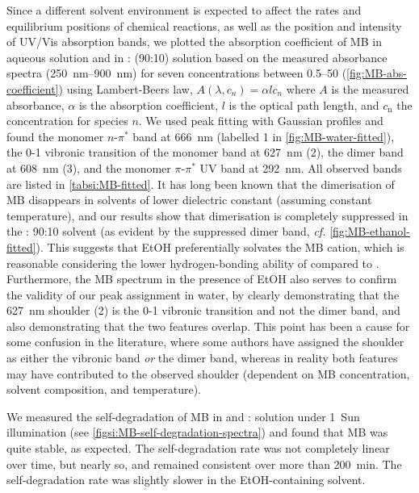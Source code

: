 \documentclass[9pt,twoside,twocolumn]{article}\usepackage{knitr}
\begin{document}
\begin{refsection}
Since a different solvent environment is expected to affect the rates and equilibrium positions of chemical reactions, as well as the position and intensity of UV/Vis absorption bands, \cite{Reichardt1994} we plotted the absorption coefficient of MB in aqueous solution and in : (90:10) solution based on the measured absorbance spectra (\qtyrange{250}{900}{\nm}) for seven concentrations between \qtyrange[range-phrase=\ensuremath{\text{ and }}]{0.5}{50}{\micromolar} (\cref{fig:MB-abs-coefficient}) using Lambert-Beers law, $A(\lambda,c_n) = \alpha lc_n$
where $A$ is the measured absorbance, $\alpha$ is the absorption coefficient, $l$ is the optical path length, and $c_\text{n}$ the concentration for species $n$.
We used peak fitting with Gaussian profiles and found the monomer $n$-$\pi^\ast$ band at \qty{666}{\nm} (labelled \textsf{1} in \cref{fig:MB-water-fitted}), the \num{0}-\num{1} vibronic transition of the monomer band at \qty{627}{\nm} (\textsf{2}), the dimer band at \qty{608}{\nm} (\textsf{3}), and the monomer $\pi$-$\pi^\ast$ UV band at \qty{292}{\nm}. 
All observed bands are listed in \cref{tabsi:MB-fitted}. 
It has long been known that the dimerisation of MB disappears in solvents of lower dielectric constant (assuming constant temperature), \cite{Lewis1943} and our results show that dimerisation is completely suppressed in the : 90:10 solvent (as evident by the suppressed dimer band, \textit{cf.} \cref{fig:MB-ethanol-fitted}).
This suggests that EtOH preferentially solvates the MB cation, which is reasonable considering the lower hydrogen-bonding ability of  compared to .
Furthermore, the MB spectrum in the presence of EtOH also serves to confirm the validity of our peak assignment in water, by clearly demonstrating that the \qty{627}{\nm} shoulder (\textsf{2}) is the \num{0}-\num{1} vibronic transition and not the dimer band, and also demonstrating that the two features overlap. 
This point has been a cause for some confusion in the literature, where some authors have assigned the shoulder as either the vibronic band \emph{or} the dimer band, \cite{Heger2005,Parkanyi1993,Cenens1988,Bergmann1963} whereas in reality both features may have contributed to the observed shoulder (dependent on MB concentration, solvent composition, and temperature). 

We measured the self-degradation of MB in  and : solution under 1~Sun illumination (see \cref{figsi:MB-self-degradation-spectra}) and found that MB was quite stable, as expected.
The self-degradation rate was not completely linear over time, but nearly so, and remained consistent over more than \qty{200}{\minute}. The self-degradation rate was slightly slower in the EtOH-containing solvent.


\end{refsection}
\end{document}
